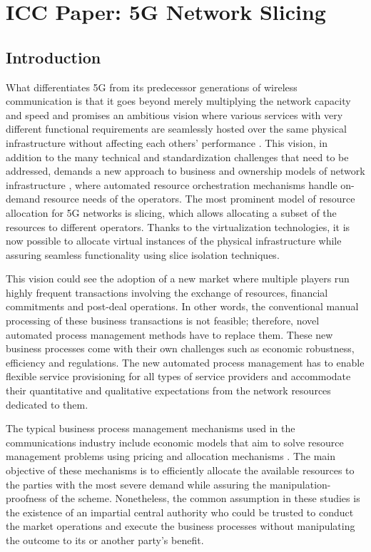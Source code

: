 \section{ICC Paper: 5G Network Slicing}

\subsection{Introduction}
\label{sec:intro}

What differentiates 5G from its predecessor generations of wireless communication is that it goes beyond merely multiplying the network capacity and speed and promises an ambitious vision where various services with very different functional requirements are seamlessly hosted over the same physical infrastructure without affecting each others' performance \cite{7980666}. This vision, in addition to the many technical and standardization challenges that need to be addressed, demands a new approach to business and ownership models of network infrastructure \cite{Afraz2019}, where automated resource orchestration mechanisms handle on-demand resource needs of the operators. The most prominent model of resource allocation for 5G networks is slicing, which allows allocating a subset of the resources to different operators. Thanks to the virtualization technologies, it is now possible to allocate virtual instances of the physical infrastructure while assuring seamless functionality using slice isolation techniques.


This vision could see the adoption of a new market where multiple players run highly frequent transactions involving the exchange of resources, financial commitments and post-deal operations. In other words, the conventional manual processing of these business transactions is not feasible; therefore, novel automated process management methods have to replace them. These new business processes come with their own challenges such as economic robustness, efficiency and regulations. 
The new automated process management has to enable flexible service provisioning for all types of service providers and accommodate their quantitative and qualitative expectations from the network resources dedicated to them.

The typical business process management mechanisms used in the communications industry include economic models that aim to solve resource management problems using pricing and allocation mechanisms \cite{8480631}. The main objective of these mechanisms is to efficiently allocate the available resources to the parties with the most severe demand while assuring the manipulation-proofness of the scheme. Nonetheless, the common assumption in these studies is the existence of an impartial central authority who could be trusted to conduct the market operations and execute the business processes without manipulating the outcome to its or another party's benefit. 

